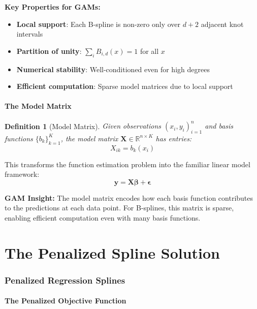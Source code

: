 \documentclass[12pt]{article}
\newtheorem{definition}{Definition}
\newcommand{\R}{\mathbb{R}}
\begin{document}
\textbf{Key Properties for GAMs:}
\begin{itemize}
    \item \textbf{Local support}: Each B-spline is non-zero only over $d+2$ adjacent knot intervals
    \item \textbf{Partition of unity}: $\sum_i B_{i,d}(x) = 1$ for all $x$
    \item \textbf{Numerical stability}: Well-conditioned even for high degrees
    \item \textbf{Efficient computation}: Sparse model matrices due to local support
\end{itemize}

\subsection{The Model Matrix}

\begin{definition}[Model Matrix]
Given observations $(x_i, y_i)_{i=1}^n$ and basis functions $\{b_k\}_{k=1}^K$, the model matrix $\mathbf{X} \in \R^{n \times K}$ has entries:
\begin{equation}
X_{ik} = b_k(x_i)
\end{equation}
\end{definition}

This transforms the function estimation problem into the familiar linear model framework:
\begin{equation}
\mathbf{y} = \mathbf{X}\bm{\beta} + \bm{\epsilon}
\end{equation}

\textbf{GAM Insight:} The model matrix encodes how each basis function contributes to the predictions at each data point. For B-splines, this matrix is sparse, enabling efficient computation even with many basis functions.

\part{The Penalized Spline Solution}

\section{Penalized Regression Splines}

\subsection{The Penalized Objective Function}
\end{document}
